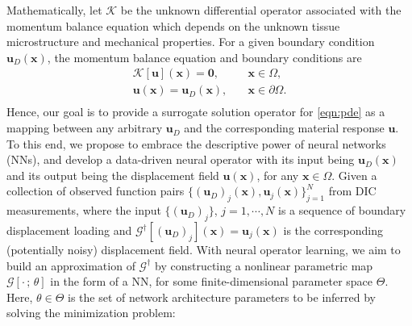 \documentclass[twocolumn,10pt]{asme2ej}
\renewcommand{\~}{\tilde}
\renewcommand{\-}{\bar}
\newcommand{\8}{\infty}
\numberwithin{equation}{section}
\newcommand{\real}{\mathbb{R}}
\newcommand{\mcK}{\mathcal{K}}
\newcommand{\mcG}{\mathcal{G}}
\newcommand{\mcF}{\mathcal{F}}
\def\omg{{\Omega}}
\def \fb{\bm{f}}
\def \ub{\bm{u}}
\def \xb{\bm{x}}
\begin{document}
Mathematically, let $\mcK$ be the unknown differential operator associated with the momentum balance equation which depends on the unknown tissue microstructure and mechanical properties. For a given boundary condition $\ub_D(\xb)$, the momentum balance equation and boundary conditions are
\begin{equation}\label{eqn:pde}
\begin{aligned} 
\mcK[\ub](\xb)=\mathbf{0},\quad&\xb\in \omg,\\
\ub(\xb)=\ub_D(\xb),\quad&\xb\in\partial \omg.\\
\end{aligned}
\end{equation}
Hence, our goal is to provide a surrogate solution operator for \eqref{eqn:pde} as a mapping between any arbitrary $\ub_D$ and the corresponding material response $\ub$. To this end, we propose to embrace the descriptive power of neural networks (NNs), and develop a data-driven neural operator with its input being $\ub_D(\xb)$ and its output being the displacement field $\ub(\xb)$, for any $\xb\in\omg$. Given a collection of observed function pairs $\{(\ub_D)_j(\xb),\ub_j(\xb)\}_{j=1}^N$ from DIC measurements, 
where the input $\{(\ub_D)_j\}$, $j=1,\cdots,N$ is a sequence of boundary displacement loading and  $\mcG^\dag[(\ub_D)_j](\xb)=\ub_j(\xb)$ is the corresponding (potentially noisy) displacement field. 
With neural operator learning, we aim to build an approximation of $\mcG^\dag$ by constructing a nonlinear parametric map $\mcG[\cdot\,;\,\theta]$ in the form of a NN, for some finite-dimensional parameter space $\Theta$. Here, $\theta\in\Theta$ is the set of network architecture parameters to be inferred by solving the minimization problem:
\end{document}
